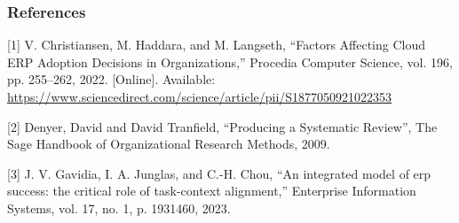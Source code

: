 \documentclass{beamer}
\begin{document}

\begin{frame}
    \frametitle{References}

    [1] V. Christiansen, M. Haddara, and M. Langseth, “Factors Affecting Cloud ERP Adoption Decisions in  Organizations,” Procedia Computer Science, vol. 196, pp. 255–262, 2022. [Online]. Available: \url{https://www.sciencedirect.com/science/article/pii/S1877050921022353}

    \vspace{2.5mm}
    [2] Denyer, David and David Tranfield, “Producing a Systematic Review”, The Sage Handbook of Organizational Research Methods, 2009.

    \vspace{2.5mm}
    [3] J. V. Gavidia, I. A. Junglas, and C.-H. Chou, “An integrated model of erp success: the critical role of task-context alignment,” Enterprise Information Systems, vol. 17, no. 1, p. 1931460, 2023.

\end{frame}
\end{document}
